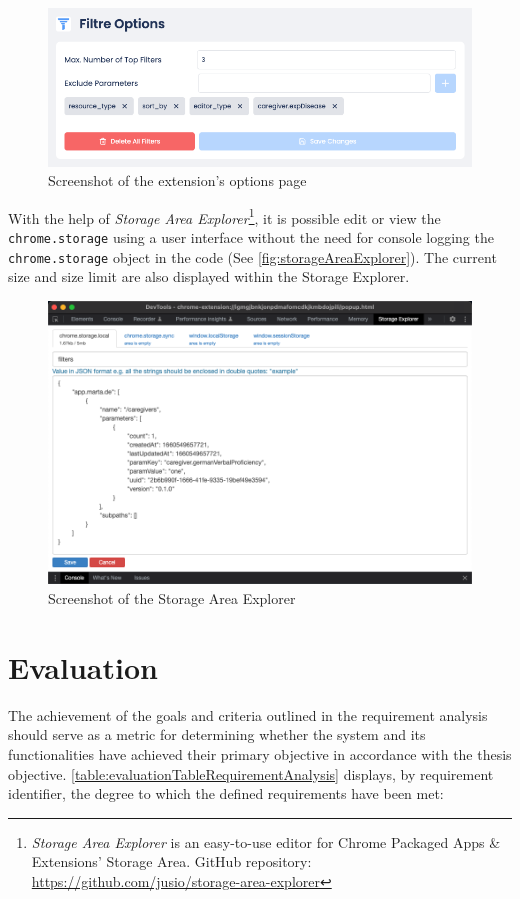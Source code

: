 \begin{figure}[H]
  \includegraphics[width=\textwidth]{assets/screenshot_filtre_options_page.png}
  \caption{Screenshot of the extension's options page}
  \label{fig:filtreOptionsPage}
\end{figure}

With the help of \emph{Storage Area Explorer}\footnote{\emph{Storage Area Explorer} is an easy-to-use editor for Chrome Packaged Apps \& Extensions' Storage Area. GitHub repository: \url{https://github.com/jusio/storage-area-explorer}}, it is possible edit or view the \texttt{chrome.storage} using a user interface without the need for console logging the \texttt{chrome.storage} object in the code (See \autoref{fig:storageAreaExplorer}). The current size and size limit are also displayed within the Storage Explorer.

\begin{figure}[H]
  \includegraphics[width=\textwidth]{assets/screenschot_storage_area_explorer.png}
  \caption{Screenshot of the Storage Area Explorer}
  \label{fig:storageAreaExplorer}
\end{figure}

\section{Evaluation}
The achievement of the goals and criteria outlined in the requirement analysis should serve as a metric for determining whether the system and its functionalities have achieved their primary objective in accordance with the thesis objective. \autoref{table:evaluationTableRequirementAnalysis} displays, by requirement identifier, the degree to which the defined requirements have been met:

